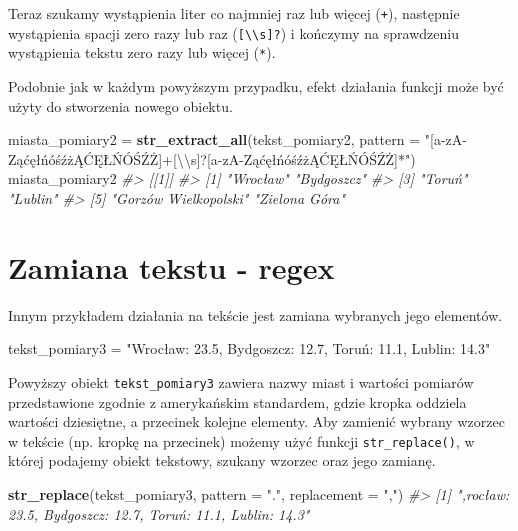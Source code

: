 \documentclass[paper=6in:9in,pagesize=pdftex,headinclude=on,footinclude=on,10pt]{scrbook}
\newenvironment{Shaded}{\begin{snugshade}}{\end{snugshade}}
\newcommand{\CharTok}[1]{\textcolor[rgb]{0.31,0.60,0.02}{#1}}
\newcommand{\CommentTok}[1]{\textcolor[rgb]{0.56,0.35,0.01}{\textit{#1}}}
\newcommand{\DataTypeTok}[1]{\textcolor[rgb]{0.13,0.29,0.53}{#1}}
\newcommand{\KeywordTok}[1]{\textcolor[rgb]{0.13,0.29,0.53}{\textbf{#1}}}
\newcommand{\NormalTok}[1]{#1}
\newcommand{\StringTok}[1]{\textcolor[rgb]{0.31,0.60,0.02}{#1}}
\begin{document}
Teraz szukamy wystąpienia liter co najmniej raz lub więcej (\texttt{+}), następnie wystąpienia spacji zero razy lub raz (\texttt{{[}\textbackslash{}\textbackslash{}s{]}?}) i kończymy na sprawdzeniu wystąpienia tekstu zero razy lub więcej (\texttt{*}).

Podobnie jak w każdym powyższym przypadku, efekt działania funkcji może być użyty do stworzenia nowego obiektu.

\begin{Shaded}
\begin{Highlighting}[]
\NormalTok{miasta_pomiary2 =}\StringTok{ }\KeywordTok{str_extract_all}\NormalTok{(tekst_pomiary2,}
       \DataTypeTok{pattern =} \StringTok{"[a-zA-ZąćęłńóśźżĄĆĘŁŃÓŚŹŻ]+[}\CharTok{\textbackslash{}\textbackslash{}}\StringTok{s]?[a-zA-ZąćęłńóśźżĄĆĘŁŃÓŚŹŻ]*"}\NormalTok{)}
\NormalTok{miasta_pomiary2}
\CommentTok{#> [[1]]}
\CommentTok{#> [1] "Wrocław"             "Bydgoszcz"          }
\CommentTok{#> [3] "Toruń"               "Lublin"             }
\CommentTok{#> [5] "Gorzów Wielkopolski" "Zielona Góra"}
\end{Highlighting}
\end{Shaded}

\hypertarget{zamiana-tekstu---regex}{%
\section{Zamiana tekstu - regex}\label{zamiana-tekstu---regex}}

Innym przykładem działania na tekście jest zamiana wybranych jego elementów.

\begin{Shaded}
\begin{Highlighting}[]
\NormalTok{tekst_pomiary3 =}\StringTok{ "Wrocław: 23.5, Bydgoszcz: 12.7, Toruń: 11.1, Lublin: 14.3"}
\end{Highlighting}
\end{Shaded}

Powyższy obiekt \texttt{tekst\_pomiary3} zawiera nazwy miast i wartości pomiarów przedstawione zgodnie z amerykańskim standardem, gdzie kropka oddziela wartości dziesiętne, a przecinek kolejne elementy.
Aby zamienić wybrany wzorzec w tekście (np. kropkę na przecinek) możemy użyć funkcji \texttt{str\_replace()}, w której podajemy obiekt tekstowy, szukany wzorzec oraz jego zamianę.

\begin{Shaded}
\begin{Highlighting}[]
\KeywordTok{str_replace}\NormalTok{(tekst_pomiary3, }
            \DataTypeTok{pattern =} \StringTok{"."}\NormalTok{, }
            \DataTypeTok{replacement =} \StringTok{","}\NormalTok{)}
\CommentTok{#> [1] ",rocław: 23.5, Bydgoszcz: 12.7, Toruń: 11.1, Lublin: 14.3"}
\end{Highlighting}
\end{Shaded}
\end{document}
